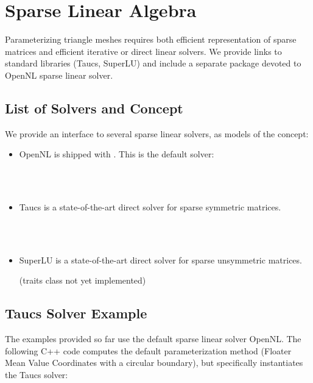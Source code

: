 \section{Sparse Linear Algebra}

Parameterizing triangle meshes requires both efficient representation
of sparse matrices and efficient iterative or direct linear
solvers. We provide links to standard libraries ({\sc Taucs}, SuperLU)
and include a separate package devoted to OpenNL sparse linear solver.

\subsection{List of Solvers and Concept}

We provide an interface to several sparse linear solvers, as models
of the  concept:

\begin{itemize}

\item OpenNL \cite{cgal:l-nmdgp-05} is shipped with \cgal. This is the default solver:

  \\
  \\

\item {\sc Taucs} is a state-of-the-art direct solver for sparse symmetric matrices.

  \\
  \\

\item SuperLU is a state-of-the-art direct solver for sparse unsymmetric matrices.

(traits class not yet implemented)

\end{itemize}


\subsection{{\sc Taucs} Solver Example}

The examples provided so far use the default sparse linear solver
OpenNL. The following C++ code computes the default parameterization
method (Floater Mean Value Coordinates with a circular boundary), but
specifically instantiates the {\sc Taucs} solver:

